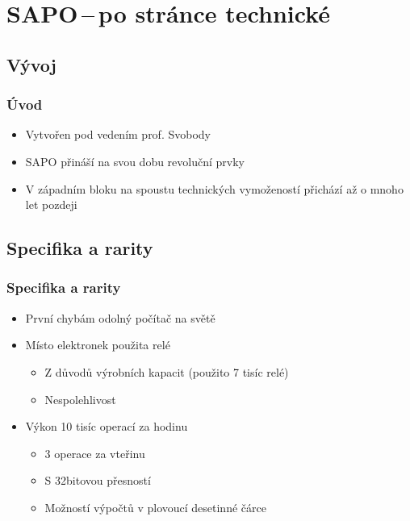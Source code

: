 \documentclass{beamer}
\begin{document}
\section{SAPO\,--\,po stránce technické}
\subsection{Vývoj}
    \begin{frame}
        \frametitle{Úvod}
        \begin{itemize}
            \item Vytvořen pod vedením prof. Svobody
            \item SAPO přináší na svou dobu revoluční prvky
            \item V západním bloku na spoustu technických vymožeností přichází až o mnoho let pozdeji
        \end{itemize}
    \end{frame}
\subsection{Specifika a rarity}
    \begin{frame}
        \frametitle{Specifika a rarity}
        \begin{itemize}
            \item První chybám odolný počítač na světě
            \item Místo elektronek použita relé
            \begin{itemize}
                \item Z důvodů výrobních kapacit (použito 7 tisíc relé)
                \item Nespolehlivost
            \end{itemize}
            \item Výkon 10 tisíc operací za hodinu
            \begin{itemize}
                \item 3 operace za vteřinu
                \item S 32bitovou přesností
                \item Možností výpočtů v plovoucí desetinné čárce
            \end{itemize}
        \end{itemize}
    \end{frame}
\end{document}
